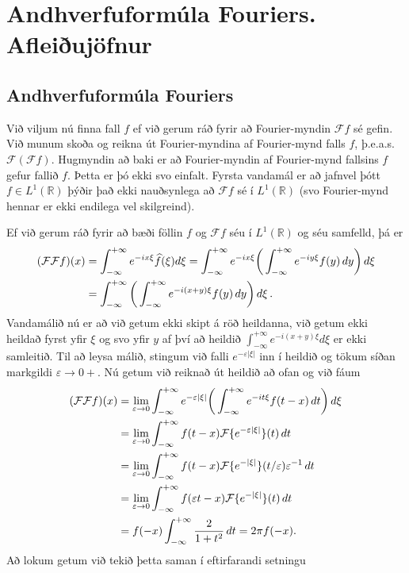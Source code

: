 \documentclass[a4paper,10pt,icelandic]{sphinxmanual}
\begin{document}
\section{Andhverfuformúla Fouriers. Afleiðujöfnur}
\label{\detokenize{Kafli04:andhverfuformula-fouriers-afleiujofnur}}

\subsection{Andhverfuformúla Fouriers}
\label{\detokenize{Kafli04:andhverfuformula-fouriers}}
Við viljum nú finna fall \(f\) ef við gerum ráð fyrir að Fourier-myndin \(\mathcal{F}f\) sé gefin. Við munum skoða og reikna út Fourier-myndina af Fourier-mynd falls \(f\), þ.e.a.s. \(\mathcal{F}(\mathcal{F}f)\). Hugmyndin að baki er að Fourier-myndin af Fourier-mynd fallsins \(f\) gefur fallið \(f\). Þetta er þó ekki svo einfalt. Fyrsta vandamál er að jafnvel þótt \(f\in L^1(\mathbb R)\) þýðir það ekki nauðsynlega að \(\mathcal{F}f\) sé í \(L^1(\mathbb R)\) (svo Fourier-mynd hennar er ekki endilega vel skilgreind).

Ef við gerum ráð fyrir að bæði föllin \(f\) og \(\mathcal{F}f\) séu í \(L^1(\mathbb R)\) og séu samfelld, þá er
\begin{equation*}
\begin{split}({{\cal F}}{{\cal F}}f)(x) &=
\int_{-\infty}^{+\infty}e^{-ix\xi} \widehat{f}(\xi) d\xi =
\int_{-\infty}^{+\infty}e^{-ix\xi}
\bigg(\int_{-\infty}^{+\infty}e^{-iy\xi}f(y) \, dy\bigg)\, d\xi\\
&=\int_{-\infty}^{+\infty}
\bigg(\int_{-\infty}^{+\infty}e^{-i(x+y)\xi}f(y) \, dy\bigg)\, d\xi\,.\end{split}
\end{equation*}
Vandamálið nú er að við getum ekki skipt á röð heildanna, við getum ekki heildað fyrst yfir \(\xi\) og svo yfir \(y\) af því að heildið \(\int_{-\infty}^{+\infty} e^{-i(x+y)\xi} d\xi\) er ekki samleitið. Til að leysa málið, stingum við falli \(e^{-\varepsilon|\xi|}\) inn í heildið og tökum síðan markgildi \(\varepsilon\to 0+\). Nú getum við reiknað út heildið að ofan og við fáum
\begin{equation*}
\begin{split}({{\cal F}}{{\cal F}}f)(x)&=\lim_{\varepsilon\to 0}
\int_{-\infty}^{+\infty}e^{-\varepsilon|\xi|}
\bigg(\int_{-\infty}^{+\infty}e^{-it\xi}f(t-x) \, dt\bigg)\, d\xi\\
&=\lim_{\varepsilon\to 0} \int_{-\infty}^{+\infty}f(t-x)
{{\cal F}}\{e^{-\varepsilon|\xi|}\}(t) \, dt\\
&=\lim_{\varepsilon\to 0} \int_{-\infty}^{+\infty}f(t-x)
{{\cal F}}\{e^{-|\xi|}\}(t/\varepsilon) \varepsilon^{-1}\, dt\\
&=\lim_{\varepsilon\to 0} \int_{-\infty}^{+\infty}f(\varepsilon t-x)
{{\cal F}}\{e^{-|\xi|}\}(t) \, dt\\
&=f(-x)\int_{-\infty}^{+\infty}\dfrac 2{1+t^2} \, dt= 2\pi f(-x).\end{split}
\end{equation*}
Að lokum getum við tekið þetta saman í eftirfarandi setningu
\end{document}

